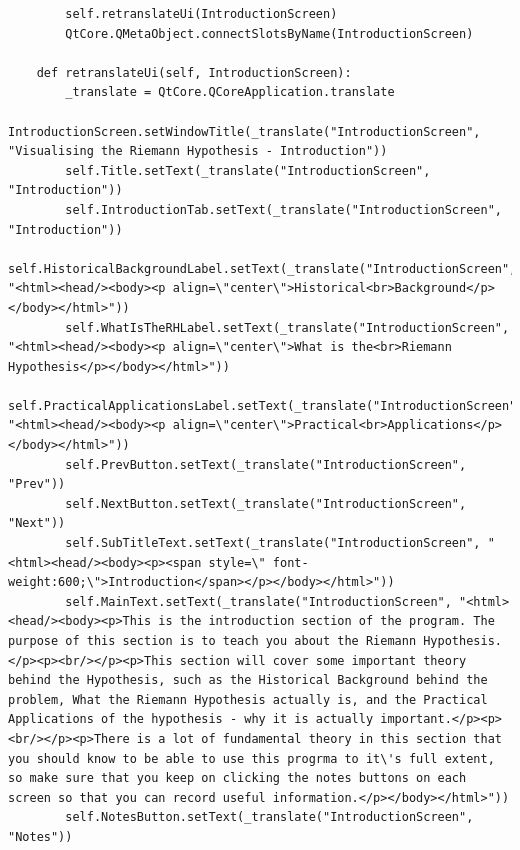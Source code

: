 \documentclass[12pt]{article}
\begin{document}
\begin{lstlisting}
        self.retranslateUi(IntroductionScreen)
        QtCore.QMetaObject.connectSlotsByName(IntroductionScreen)

    def retranslateUi(self, IntroductionScreen):
        _translate = QtCore.QCoreApplication.translate
        IntroductionScreen.setWindowTitle(_translate("IntroductionScreen", "Visualising the Riemann Hypothesis - Introduction"))
        self.Title.setText(_translate("IntroductionScreen", "Introduction"))
        self.IntroductionTab.setText(_translate("IntroductionScreen", "Introduction"))
        self.HistoricalBackgroundLabel.setText(_translate("IntroductionScreen", "<html><head/><body><p align=\"center\">Historical<br>Background</p></body></html>"))
        self.WhatIsTheRHLabel.setText(_translate("IntroductionScreen", "<html><head/><body><p align=\"center\">What is the<br>Riemann Hypothesis</p></body></html>"))
        self.PracticalApplicationsLabel.setText(_translate("IntroductionScreen", "<html><head/><body><p align=\"center\">Practical<br>Applications</p></body></html>"))
        self.PrevButton.setText(_translate("IntroductionScreen", "Prev"))
        self.NextButton.setText(_translate("IntroductionScreen", "Next"))
        self.SubTitleText.setText(_translate("IntroductionScreen", "<html><head/><body><p><span style=\" font-weight:600;\">Introduction</span></p></body></html>"))
        self.MainText.setText(_translate("IntroductionScreen", "<html><head/><body><p>This is the introduction section of the program. The purpose of this section is to teach you about the Riemann Hypothesis.</p><p><br/></p><p>This section will cover some important theory behind the Hypothesis, such as the Historical Background behind the problem, What the Riemann Hypothesis actually is, and the Practical Applications of the hypothesis - why it is actually important.</p><p><br/></p><p>There is a lot of fundamental theory in this section that you should know to be able to use this progrma to it\'s full extent, so make sure that you keep on clicking the notes buttons on each screen so that you can record useful information.</p></body></html>"))
        self.NotesButton.setText(_translate("IntroductionScreen", "Notes"))
\end{lstlisting}
\end{document}
